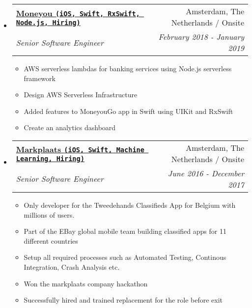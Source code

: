 \documentclass[letterpaper,11pt]{article}
\makeatletter
\newcommand{\resitem}[1]{\item #1 \vspace{-2pt}}
\newcommand{\ressubheading}[4]{
\begin{tabular*}{7.0in}{l@{\extracolsep{\fill}}r}
    \textbf{#1} & #2 \\
    \textit{#3} & \textit{#4} \\
\end{tabular*}\vspace{-6pt}}
\makeatother
\begin{document}
\begin{itemize}
    
\item
    \ressubheading{\href{https://www.moneyou.nl/}{Moneyou \texttt{(iOS, Swift, RxSwift, Node.js, Hiring)}}}{Amsterdam, The Netherlands / Onsite}{Senior Software Engineer}{February 2018 - January 2019}
    \begin{itemize}
        \resitem{AWS serverless lambdas for banking services using Node.js serverless framework}
        \resitem{Design AWS Serverless Infrastructure}
        \resitem{Added features to MoneyouGo app in Swift using UIKit and RxSwift}
        \resitem{Create an analytics dashboard}
    \end{itemize}
    
\item
    \ressubheading{\href{https://www.markplaats.nl/}{Markplaats \texttt{(iOS, Swift, Machine Learning, Hiring)}}}{Amsterdam, The Netherlands / Onsite}{Senior Software Engineer}{June 2016 - December 2017}
    \begin{itemize}
        \resitem{Only developer for the Tweedehands Classifieds App for Belgium with millions of users.}
        \resitem{Part of the EBay global mobile team building classified apps for 11 different countries}
        \resitem{Setup all required processes such as Automated Testing, Continous Integration, Crash Analysis etc.}
        \resitem{Won the markplaats company hackathon}
        \resitem{Successfully hired and trained replacement for the role before exit}
    \end{itemize}


\end{itemize}

\vspace{0.2in}
\end{document}
